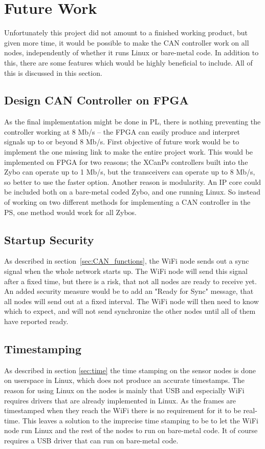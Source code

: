 
\section{Future Work}\label{sec:future_work}
Unfortunately this project did not amount to a finished working product, but given more time, it would be possible to make the CAN controller work on all nodes, independently of whether it runs Linux or bare-metal code.
In addition to this, there are some features which would be  highly beneficial to include.
All of this is discussed in this section.

\subsection*{Design CAN Controller on FPGA}
As the final implementation might be done in PL, there is nothing preventing the controller working at 8 Mb/s -- the FPGA can easily produce and interpret signals up to or beyond 8 Mb/s.
First objective of future work would be to implement the one missing link to make the entire project work.
This would be implemented on FPGA for two reasons;
the XCanPs controllers built into the Zybo can operate up to 1 Mb/s, but the transceivers can operate up to 8 Mb/s, so better to use the faster option.
Another reason is modularity.
An IP core could be included both on a bare-metal coded Zybo, and one running Linux.
So instead of working on two different methods for implementing a CAN controller in the PS, one method would work for all Zybos.

\subsection*{Startup Security}
As described in section~\ref{sec:CAN_functions}, the WiFi node sends out a sync signal when the whole network starts up.
The WiFi node will send this signal after a fixed time, but there is a risk, that not all nodes are ready to receive yet. 
An added security measure would be to add an "Ready for Sync" message, that all nodes will send out at a fixed interval.
The WiFi node will then need to know which to expect, and will not send synchronize the other nodes until all of them have reported ready.

\subsection*{Timestamping}
As described in section \ref{sec:time} the time stamping on the sensor nodes is done on userspace in Linux, which does not produce an  accurate timestamps.
The reason for using Linux on the nodes is mainly that USB and especially WiFi requires drivers that are already implemented in Linux.
As the frames are timestamped when they reach the WiFi there is no requirement for it to be real-time.
This leaves a solution to the imprecise time stamping to be to let the WiFi node run Linux and the rest of the nodes to run on bare-metal code.
It of course requires a USB driver that can run on bare-metal code.

